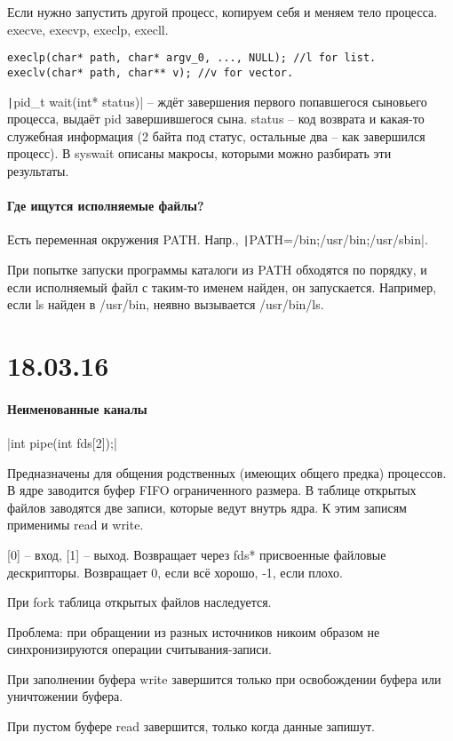 \documentclass[a4paper,10pt]{article}
\newcommand{\cl}{\mint{c}}
\newcommand{\bash}{\texttt}
\begin{document}
Если нужно запустить другой процесс, копируем себя и меняем тело процесса.
execve, execvp, execlp, execll.

\begin{verbatim}
execlp(char* path, char* argv_0, ..., NULL); //l for list.
execlv(char* path, char** v); //v for vector.
\end{verbatim}

\texttt|pid_t wait(int* status)| -- ждёт завершения первого попавшегося сыновьего процесса, выдаёт pid завершившегося сына. status -- код возврата и какая-то служебная информация (2 байта под статус, остальные два -- как завершился процесс). В syswait описаны макросы, которыми можно разбирать эти результаты.

\paragraph{Где ищутся исполняемые файлы?}
Есть переменная окружения PATH. Напр., \bash|PATH=/bin;/usr/bin;/usr/sbin|. 

При попытке запуски программы каталоги из PATH обходятся по порядку, и если исполняемый файл с таким-то именем найден, он запускается. 
Например, если ls найден в /usr/bin, неявно вызывается /usr/bin/ls.

\section{18.03.16}
\paragraph{Неименованные каналы}
\cl|int pipe(int fds[2]);|

Предназначены для общения родственных (имеющих общего предка) процессов.
В ядре заводится буфер FIFO ограниченного размера. В таблице открытых файлов заводятся две записи, которые ведут внутрь ядра. К этим записям применимы read и write.

[0] -- вход, [1] -- выход. Возвращает через fds* присвоенные файловые дескрипторы. Возвращает 0, если всё хорошо, -1, если плохо.

При fork таблица открытых файлов наследуется.

Проблема: при обращении из разных источников никоим образом не синхронизируются операции считывания-записи.

При заполнении буфера write завершится только при освобождении буфера или уничтожении буфера.

При пустом буфере read завершится, только когда данные запишут.
\end{document}
